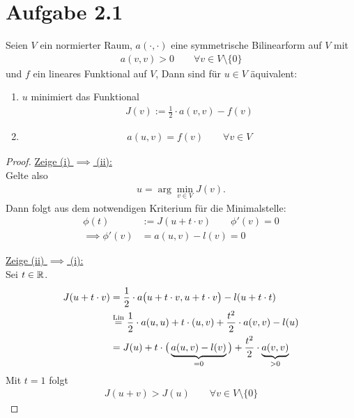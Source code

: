 \documentclass[12pt,a4paper]{article}
\author{Willi Sontopski}
\begin{document}

\section*{Aufgabe 2.1}
Seien $V$ ein normierter Raum, $a(\cdot,\cdot)$ eine symmetrische Bilinearform auf $V$ mit
\begin{align*}
a(v,v)>0\qquad\forall v\in V\setminus\lbrace0\rbrace
\end{align*}
und $f$ ein lineares Funktional auf $V$, Dann sind für $u\in V$ äquivalent:
\begin{enumerate}[label=(\roman*)]
\item $u$ minimiert das Funktional 
\begin{align}\label{Variationsproblem}\tag{Variationsproblem}
J(v):=\frac{1}{2}\cdot a(v,v)-f(v)
\end{align}
\item \begin{align}\label{Variationsgleichung}\tag{Variationsgleichung}
a(u,v)=f(v)\qquad\forall v\in V
\end{align}
\end{enumerate}

\begin{proof}
\underline{Zeige (i) $\implies$ (ii):}\\
Gelte also 
\begin{align*}
u=\arg\min\limits_{v\in V} J(v).
\end{align*}
Dann folgt aus dem notwendigen Kriterium für die Minimalstelle:
\begin{align*}
\phi(t)&:=J(u+t\cdot v)\qquad\phi'(v)=0\\
\implies
\phi'(v)&=a(u,v)-l(v)=0
\end{align*}

\underline{Zeige (ii) $\implies$ (i):}\\
Sei $t\in\mathbb{R}$.
\begin{align*}
J(u+t\cdot v)&=
\frac{1}{2}\cdot a\big(u+t\cdot v,u+t\cdot v\big)-l(u+t\cdot t)\\
&\stackrel{\text{Lin}}{=}
\frac{1}{2}\cdot a(u,u)+t\cdot (u,v)+\frac{t^2}{2}\cdot a(v,v)-l(u)\\
&=J(u)+t\cdot\big(\underbrace{a(u,v)-l(v)}_{=0}\big)+\frac{t^2}{2}\cdot \underbrace{a(v,v)}_{>0}
\end{align*}
Mit $t=1$ folgt
\begin{align*}
J(u+v)>J(u)\qquad\forall v\in V\setminus\lbrace 0\rbrace
\end{align*}
\end{proof}
\end{document}
